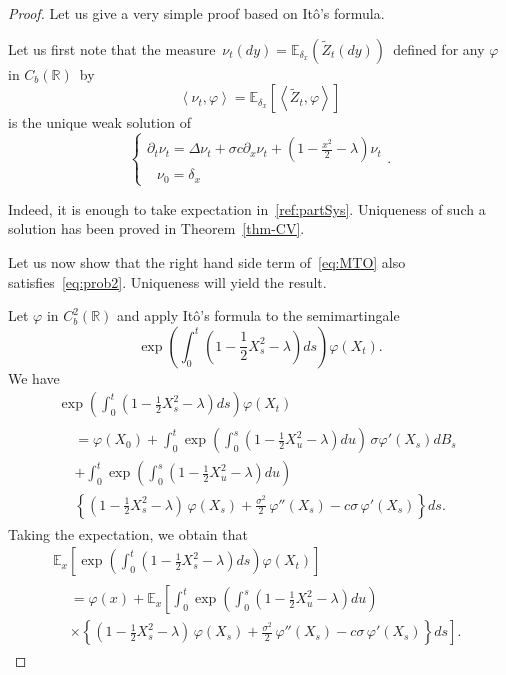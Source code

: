 \documentclass[AHL,Unicode,longabstracts,published]{cedram}
\newcommand*\R{\mathbb{R}}
\newcommand*\E{\mathbb{E}}
\begin{document}
\begin{proof}
Let us give a very simple proof based on It\^o's formula.


Let us first note that the measure $\,
\nu_{t}(dy)=\E_{\delta_{x}}(\widetilde{Z}_{t}(dy))\,$ defined for any $\varphi$ in $C_{b}(\R)$~by
\[
\left\langle\nu_{t}, \varphi \right\rangle =\E_{\delta_{x}}\left[\left\langle \widetilde{Z}_{t}, \varphi\right\rangle \right]
\]
is the unique weak solution of
\begin{equation}\label{eq:prob2}
\begin{cases}
\partial_{t}\nu_{t} =\Delta \nu_{t} + \sigma c \partial_{x}\nu_{t}+\left(1-\frac{x^2}{2}-\lambda\right)\nu_{t}\\
\;\;\,\nu_{0} =\delta_{x}
\end{cases}.
\end{equation}

Indeed, it is enough to take expectation in~\eqref{ref:partSys}. Uniqueness of such a solution has been proved in Theorem~\ref{thm-CV}.


Let us now show that the right hand side term of~\eqref{eq:MTO} also satisfies~\eqref{eq:prob2}. Uniqueness will yield the result.


Let $\varphi$ in $C^2_{b}(\R)$ and apply Itô's formula to the semimartingale
\[
\exp\left(\int_{0}^{t} \left(1-\frac{1}{2}X_{s}^{2}-\lambda \right)ds \right)\varphi(X_{t}).
\]
We have
\begin{multline*}
\exp\left(\int_{0}^{t} \left(1-\frac{1}{2}X_{s}^{2}-\lambda \right)ds \right)\varphi(X_{t})\\
\begin{aligned}
&= \varphi\left(X_{0}\right) + \int_{0}^t \exp\left(\int_{0}^{s} \left(1-\frac{1}{2}X_{u}^{2}-\lambda \right)du \right)\,\sigma\varphi'\left(X_{s}\right) dB_{s} \\
&+ \int_{0}^t \exp\left(\int_{0}^{s} \left(1-\frac{1}{2}X_{u}^{2}-\lambda \right)du \right) \\
&\left\{\left(1-\frac{1}{2}X_{s}^{2}-\lambda \right)\,\varphi\left(X_{s}\right) + \frac{\sigma^2}{2}\,\varphi''\left(X_{s}\right)- c \sigma\,\varphi'\left(X_{s}\right)\right\}ds.
\end{aligned}
\end{multline*}
Taking the expectation, we obtain that
\begin{multline} \label{ito}
\E_{x}\left[\exp\left(\int_{0}^{t} \left(1-\frac{1}{2} X_{s}^{2}-\lambda \right)ds \right)\varphi\left(X_{t}\right) \right]\\
\begin{aligned}
&=\varphi(x) + \E_{x}\left[\int_{0}^t \exp\left(\int_{0}^{s} \left(1-\frac{1}{2}X_{u}^{2}-\lambda \right)du \right) \right.\\
&\times\left. \left\{\left(1-\frac{1}{2}X_{s}^{2}-\lambda \right)\,\varphi\left(X_{s}\right) + \frac{\sigma^2}{2}\,\varphi''(X_{s})- c \sigma\,\varphi'\left(X_{s}\right)\right\}ds\right].
\end{aligned}
\end{multline}


\end{proof}
\end{document}
